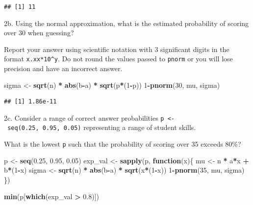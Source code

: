 \documentclass[
]{article}
\newenvironment{Shaded}{\begin{snugshade}}{\end{snugshade}}
\newcommand{\ControlFlowTok}[1]{\textcolor[rgb]{0.13,0.29,0.53}{\textbf{#1}}}
\newcommand{\DecValTok}[1]{\textcolor[rgb]{0.00,0.00,0.81}{#1}}
\newcommand{\FloatTok}[1]{\textcolor[rgb]{0.00,0.00,0.81}{#1}}
\newcommand{\KeywordTok}[1]{\textcolor[rgb]{0.13,0.29,0.53}{\textbf{#1}}}
\newcommand{\NormalTok}[1]{#1}
\newcommand{\OperatorTok}[1]{\textcolor[rgb]{0.81,0.36,0.00}{\textbf{#1}}}
\newcommand{\StringTok}[1]{\textcolor[rgb]{0.31,0.60,0.02}{#1}}
\begin{document}
\begin{verbatim}
## [1] 11
\end{verbatim}

2b. Using the normal approximation, what is the estimated probability of
scoring over 30 when guessing?

Report your answer using scientific notation with 3 significant digits
in the format \texttt{x.xx*10\^{}y}. Do not round the values passed to
\texttt{pnorm} or you will lose precision and have an incorrect answer.

\begin{Shaded}
\begin{Highlighting}[]
\NormalTok{sigma \textless{}{-}}\StringTok{ }\KeywordTok{sqrt}\NormalTok{(n) }\OperatorTok{*}\StringTok{ }\KeywordTok{abs}\NormalTok{(b}\OperatorTok{{-}}\NormalTok{a) }\OperatorTok{*}\StringTok{ }\KeywordTok{sqrt}\NormalTok{(p}\OperatorTok{*}\NormalTok{(}\DecValTok{1}\OperatorTok{{-}}\NormalTok{p))}
\DecValTok{1}\OperatorTok{{-}}\KeywordTok{pnorm}\NormalTok{(}\DecValTok{30}\NormalTok{, mu, sigma)}
\end{Highlighting}
\end{Shaded}

\begin{verbatim}
## [1] 1.86e-11
\end{verbatim}

2c. Consider a range of correct answer probabilities
\texttt{p\ \textless{}-\ seq(0.25,\ 0.95,\ 0.05)} representing a range
of student skills.

What is the lowest \texttt{p} such that the probability of scoring over
35 exceeds 80\%?

\begin{Shaded}
\begin{Highlighting}[]
\NormalTok{p \textless{}{-}}\StringTok{ }\KeywordTok{seq}\NormalTok{(}\FloatTok{0.25}\NormalTok{, }\FloatTok{0.95}\NormalTok{, }\FloatTok{0.05}\NormalTok{)}
\NormalTok{exp\_val \textless{}{-}}\StringTok{ }\KeywordTok{sapply}\NormalTok{(p, }\ControlFlowTok{function}\NormalTok{(x)\{}
\NormalTok{  mu \textless{}{-}}\StringTok{ }\NormalTok{n }\OperatorTok{*}\StringTok{ }\NormalTok{a}\OperatorTok{*}\NormalTok{x }\OperatorTok{+}\StringTok{ }\NormalTok{b}\OperatorTok{*}\NormalTok{(}\DecValTok{1}\OperatorTok{{-}}\NormalTok{x)}
\NormalTok{  sigma \textless{}{-}}\StringTok{ }\KeywordTok{sqrt}\NormalTok{(n) }\OperatorTok{*}\StringTok{ }\KeywordTok{abs}\NormalTok{(b}\OperatorTok{{-}}\NormalTok{a) }\OperatorTok{*}\StringTok{ }\KeywordTok{sqrt}\NormalTok{(x}\OperatorTok{*}\NormalTok{(}\DecValTok{1}\OperatorTok{{-}}\NormalTok{x))}
  \DecValTok{1}\OperatorTok{{-}}\KeywordTok{pnorm}\NormalTok{(}\DecValTok{35}\NormalTok{, mu, sigma)}
\NormalTok{\})}

\KeywordTok{min}\NormalTok{(p[}\KeywordTok{which}\NormalTok{(exp\_val }\OperatorTok{\textgreater{}}\StringTok{ }\FloatTok{0.8}\NormalTok{)])}
\end{Highlighting}
\end{Shaded}
\end{document}
